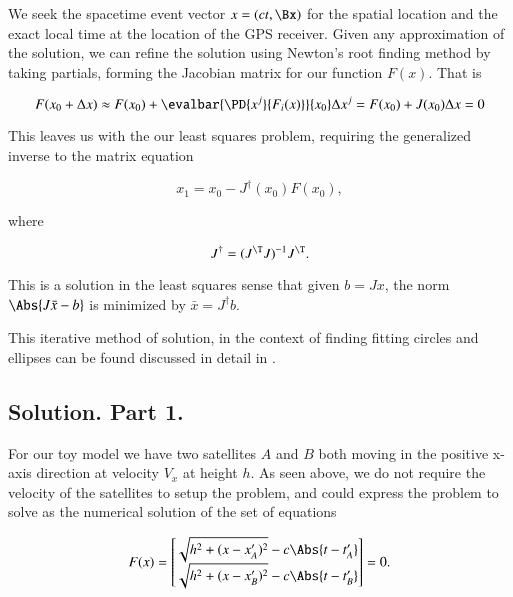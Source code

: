 We seek the spacetime event vector $x = (c t, \Bx)$ for the spatial location and the exact local time at the location of the GPS receiver.  Given any approximation of the solution, we can refine the solution using Newton's root finding method by taking partials, forming the Jacobian matrix for our function $F(x)$.  That is

\begin{equation}\label{eqn:relativisticElectrodynamicsA1:320}
F(x_0 + \Delta x) \approx F(x_0) + \evalbar{\PD{x^j}{F_i(x)}}{x_0} \Delta x^j = F(x_0) + J(x_0) \Delta x = 0
\end{equation}

This leaves us with the our least squares problem, requiring the generalized inverse to the matrix equation

\begin{equation}\label{eqn:relativisticElectrodynamicsA1:330}
x_1 = x_0 - J^\dagger (x_0) F(x_0),
\end{equation}

where 

\begin{equation}\label{eqn:relativisticElectrodynamicsA1:340}
J^\dagger = (J^\T J)^{-1} J^\T.
\end{equation}

This is a solution in the least squares sense that given $b = J x$, the norm $\Abs{ J \bar{x} - b}$ is minimized by $\bar{x} = J^\dagger b$.

This iterative method of solution, in the context of finding fitting circles and ellipses can be found discussed in detail in \citep{gander1994least}.

\subsection{Solution. Part 1.}

For our toy model we have two satellites $A$ and $B$ both moving in the positive x-axis direction at velocity $V_x$ at height $h$.  As seen above, we do not require the velocity of the satellites to setup the problem, and could express the problem to solve as the numerical solution of the set of equations

\begin{equation}\label{eqn:relativisticElectrodynamicsA1:350}
F(x) = 
\begin{bmatrix}
\sqrt{ h^2 + (x - x_A')^2 } - c \Abs{t - t_A'} \\
\sqrt{ h^2 + (x - x_B')^2 } - c \Abs{t - t_B'} \\
\end{bmatrix} = 0.
\end{equation}

